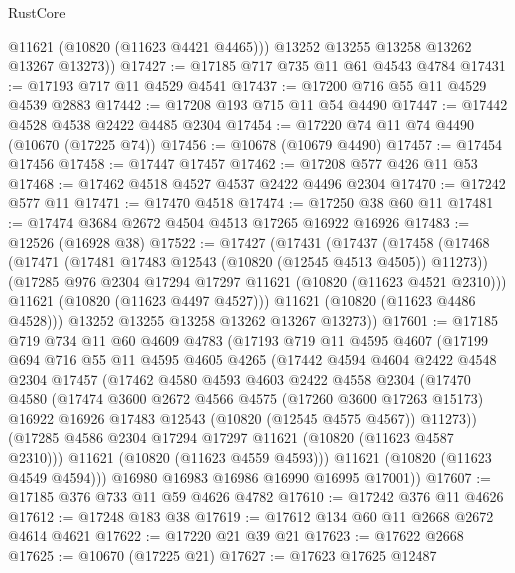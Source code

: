 \begin{lexlean}{RustCore}
\begin{coremodule}
          @11621
          (@10820 (@11623 @4421 @4465)))
        @13252
        @13255
        @13258
        @13262
        @13267
        @13273))
@17427 := @17185 @717 @735 @11 @61 @4543 @4784
@17431 := @17193 @717 @11 @4529 @4541
@17437 := @17200 @716 @55 @11 @4529 @4539 @2883
@17442 := @17208 @193 @715 @11 @54 @4490
@17447 := @17442 @4528 @4538 @2422 @4485 @2304
@17454 := @17220 @74 @11 @74 @4490 (@10670 (@17225 @74))
@17456 := @10678 (@10679 @4490)
@17457 := @17454 @17456
@17458 := @17447 @17457
@17462 := @17208 @577 @426 @11 @53
@17468 := @17462 @4518 @4527 @4537 @2422 @4496 @2304
@17470 := @17242 @577 @11
@17471 := @17470 @4518
@17474 := @17250 @38 @60 @11
@17481 := @17474 @3684 @2672 @4504 @4513 @17265 @16922 @16926
@17483 := @12526 (@16928 @38)
@17522 := @17427
    (@17431
      (@17437
        (@17458
          (@17468
            (@17471 (@17481 @17483 @12543 (@10820 (@12545 @4513 @4505)) @11273))
            (@17285 @976 @2304 @17294 @17297 @11621 (@10820 (@11623 @4521 @2310)))
            @11621
            (@10820 (@11623 @4497 @4527)))
          @11621
          (@10820 (@11623 @4486 @4528)))
        @13252
        @13255
        @13258
        @13262
        @13267
        @13273))
@17601 := @17185
    @719
    @734
    @11
    @60
    @4609
    @4783
    (@17193
      @719
      @11
      @4595
      @4607
      (@17199
        @694
        @716
        @55
        @11
        @4595
        @4605
        @4265
        (@17442
          @4594
          @4604
          @2422
          @4548
          @2304
          @17457
          (@17462
            @4580
            @4593
            @4603
            @2422
            @4558
            @2304
            (@17470
              @4580
              (@17474
                @3600
                @2672
                @4566
                @4575
                (@17260 @3600 @17263 @15173)
                @16922
                @16926
                @17483
                @12543
                (@10820 (@12545 @4575 @4567))
                @11273))
            (@17285 @4586 @2304 @17294 @17297 @11621 (@10820 (@11623 @4587 @2310)))
            @11621
            (@10820 (@11623 @4559 @4593)))
          @11621
          (@10820 (@11623 @4549 @4594)))
        @16980
        @16983
        @16986
        @16990
        @16995
        @17001))
@17607 := @17185 @376 @733 @11 @59 @4626 @4782
@17610 := @17242 @376 @11 @4626
@17612 := @17248 @183 @38
@17619 := @17612 @134 @60 @11 @2668 @2672 @4614 @4621
@17622 := @17220 @21 @39 @21
@17623 := @17622 @2668
@17625 := @10670 (@17225 @21)
@17627 := @17623 @17625 @12487

\end{coremodule}
\end{lexlean}
